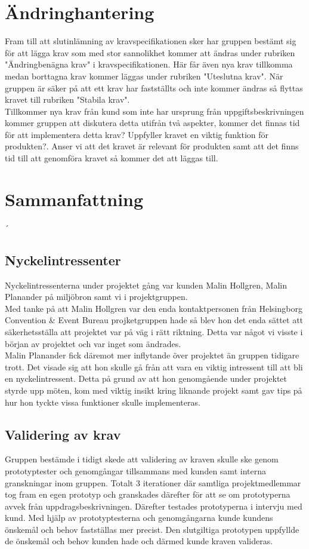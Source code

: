 \documentclass[12pt]{article}
\begin{document}
\section{Ändringhantering}
Fram till att slutinlämning av kravspecifikationen sker har gruppen bestämt sig för att lägga krav som med stor sannolikhet kommer att ändras under rubriken "Ändringbenägna krav" i kravspecifikationen. Här får även nya krav tillkomma medan borttagna krav kommer läggas under rubriken "Uteslutna krav". När gruppen är säker på att ett krav har fastställts och inte kommer ändras så flyttas kravet till rubriken "Stabila krav". \\
Tillkommer nya krav från kund som inte har ursprung från uppgiftsbeskrivningen kommer gruppen att diskutera detta utifrån två aspekter, kommer det finnas tid för att implementera detta krav? Uppfyller kravet en viktig funktion för produkten?. Anser vi att det kravet är relevant för produkten samt att det finns tid till att genomföra kravet så kommer det att läggas till.  
	
\section{Sammanfattning}´

\subsection{Nyckelintressenter}
Nyckelintressenterna under projektet gång var kunden Malin Hollgren, Malin Planander på miljöbron samt vi i projektgruppen. \\
Med tanke på att Malin Hollgren var den enda kontaktpersonen från Helsingborg Convention & Event Bureau projketgruppen hade så blev hon det enda sättet att säkerhetsställa att projektet var på väg i rätt riktning. Detta var något vi visste i början av projektet och var inget som ändrades. \\
Malin Planander fick däremot mer inflytande över projektet än gruppen tidigare trott. Det visade sig att hon skulle gå från att vara en viktig intressent till att bli en nyckelintressent. Detta på grund av att hon genomgående under projektet styrde upp möten, kom med viktig insikt kring liknande projekt samt gav tips på hur hon tyckte vissa funktioner skulle implementeras.
\\ 

\subsection{Validering av krav}
Gruppen bestämde i tidigt skede att validering av kraven skulle ske genom prototyptester och genomgångar tillsammans med kunden samt interna granskningar inom gruppen. Totalt 3 iterationer där samtliga projektmedlemmar tog fram en egen prototyp och granskades därefter för att se om prototyperna avvek från uppdragsbeskrivningen. Därefter testades prototyperna i intervju med kund. Med hjälp av prototyptesterna och genomgångarna kunde kundens önskemål och behov fastställas mer precist. Den slutgiltiga prototypen uppfyllde de önskemål och behov kunden hade och därmed kunde kraven valideras.\\\\
\end{document}
